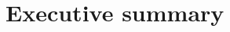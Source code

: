 \begin{comment}
In short, you asked for these terms, now you’re stuck with them. We call that the rule of law. Complete decision here. There was some earlier debate about what equal treatment means, but the decision evidently resolves that for now.

The problem. The fundamental problem here is that there is no clean mechanism for dealing with sovereign bankruptcy. With corporate bankruptcy, the creditors get the assets. With sovereign default, that’s not the case. That’s why we call them sovereigns. With corporate bankruptcy, the judge generally has enough leverage to force agreement among creditors. With sovereign default, there’s no one to play that role. Bonds could be issued with collection action clauses, making agreement by (say) two-thirds of bondholders binding on the rest, but that’s unusual — and Argentina’s bonds had no such clause. So sovereign default is inherently a messier situation than corporate (or personal) bankruptcy.

Policy experts have voiced two opinions about the decision. One is that it makes sovereign debt problems worse, because bondholders will be less willing to go along with restructuring. France argued that it “threatens international financial stability.” The other opinion is that this is the law Argentina asked for, we shouldn’t change it after the fact. Neither solves the fundamental problem with sovereign default.

The consequences. The decision brings into question Argentina’s payments to exchange bondholders. If they’re paid in New York, they can be seized and given to the holdouts. They could in principle be paid somewhere else (Buenos Aires?), but that raises the possibility that anyone involved would be violating the law. If it’s done anyway, does that qualify as a credit event in the CDS market? And will the Supreme Court weigh in? There’s lots of material left on the table, so let’s hope the show will continue beyond this season.

\url{http://nyusterneconomics.wordpress.com/2013/08/24/argentinas-hedge-fund-grudge-match-continues/}

Also:  Greece as an example.  Note that jurisdiction matters...

Check out: http://papers.ssrn.com/sol3/papers.cfm?abstract_id=2144932


\end{comment}



\section*{Executive summary}

